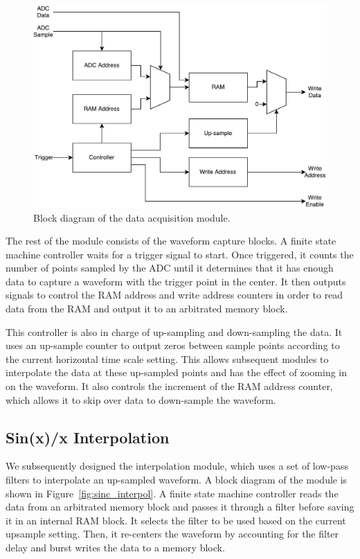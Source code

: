 \documentclass[journal]{IEEEtran}
\begin{document}
\begin{figure}[!htb]
  \centering
  \includegraphics[width=\columnwidth]{diagrams/data_acquisition.pdf}
  \caption{Block diagram of the data acquisition module.}
  \label{fig:data_acquisition}
\end{figure}

The rest of the module consists of the waveform capture blocks. A finite state machine controller waits for a trigger signal to start. Once triggered, it counts the number of points sampled by the ADC until it determines that it has enough data to capture a waveform with the trigger point in the center. It then outputs signals to control the RAM address and write address counters in order to read data from the RAM and output it to an arbitrated memory block.

This controller is also in charge of up-sampling and down-sampling the data. It uses an up-sample counter to output zeros between sample points according to the current horizontal time scale setting. This allows subsequent modules to interpolate the data at these up-sampled points and has the effect of zooming in on the waveform. It also controls the increment of the RAM address counter, which allows it to skip over data to down-sample the waveform.

\subsection{Sin(x)/x Interpolation}

We subsequently designed the interpolation module, which uses a set of low-pass filters to interpolate an up-sampled waveform. A block diagram of the module is shown in Figure~\ref{fig:sinc_interpol}. A finite state machine controller reads the data from an arbitrated memory block and passes it through a filter before saving it in an internal RAM block. It selects the filter to be used based on the current upsample setting. Then, it re-centers the waveform by accounting for the filter delay and burst writes the data to a memory block.
\end{document}
